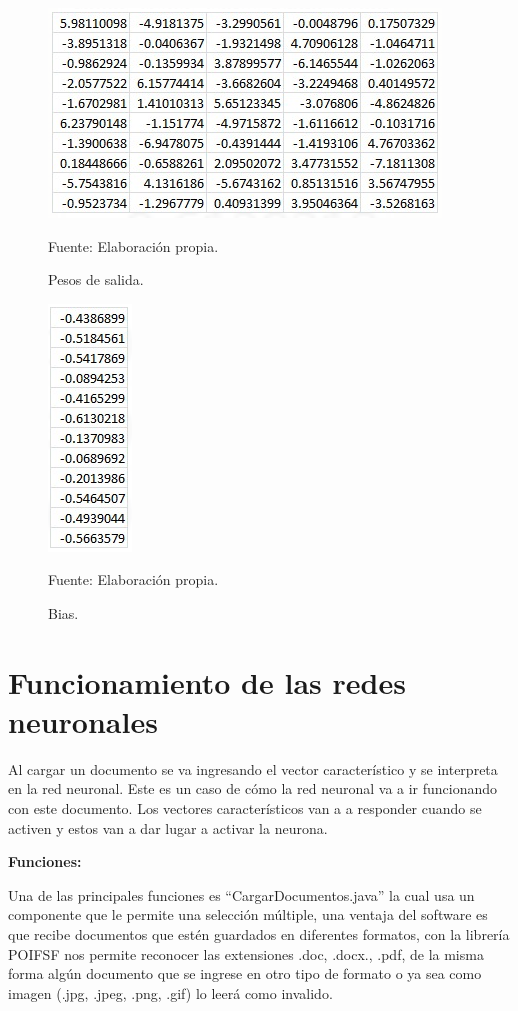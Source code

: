 \begin{figure}[h!]
	\centering
		\includegraphics[scale=0.6]{imagenes/pesosDeSalida.png}
		\caption{Pesos de salida.}
		\begin{center}
    Fuente: Elaboración propia.
    \end{center}
	\label{fig:pesosDeSalida}
\end{figure}
\begin{figure}[h!]
	\centering
		\includegraphics[scale=0.6]{imagenes/Bias.png}
		\caption{Bias.}
		\begin{center}
    Fuente: Elaboración propia.
    \end{center}
	\label{fig:Bias}
\end{figure}

\section{Funcionamiento de las redes neuronales}
Al cargar un documento se va ingresando el vector característico y se interpreta en la red neuronal.
Este es un caso de cómo la red neuronal va a ir funcionando con este documento.
Los vectores característicos van a a responder cuando se activen y estos van a dar lugar a activar la neurona.

\textbf{Funciones:}

Una de las principales funciones es ``CargarDocumentos.java'' la cual usa un componente que le permite una selección múltiple, una ventaja del software es que recibe documentos que estén guardados en diferentes formatos, con la librería POIFSF nos permite reconocer las extensiones .doc, .docx., .pdf, de la misma forma algún documento que se ingrese en otro tipo de formato o ya sea como imagen (.jpg, .jpeg, .png, .gif) lo leerá como invalido.

